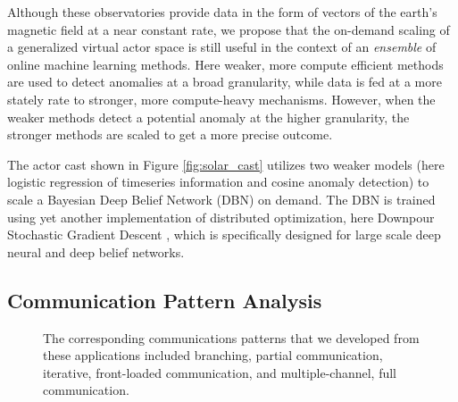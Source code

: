 \documentclass[conference,twocolumn,11pt]{IEEEtran}
\begin{document}
Although these observatories provide data in the form of vectors of the earth's magnetic field at a near constant rate, we propose that the on-demand scaling of a generalized virtual actor space is still useful in the context of an \textit{ensemble} of online machine learning methods. Here weaker, more compute efficient methods are used to detect anomalies at a broad granularity, while data is fed at a more stately rate to stronger, more compute-heavy mechanisms. However, when the weaker methods detect a potential anomaly at the higher granularity, the stronger methods are scaled to get a more precise outcome.

The actor cast shown in Figure \ref{fig:solar_cast} utilizes two weaker models (here logistic regression of timeseries information and cosine anomaly detection) to scale a Bayesian Deep Belief Network (DBN) on demand. The DBN is trained using yet another implementation of distributed optimization, here Downpour Stochastic Gradient Descent \cite{dean_large_2012}, which is specifically designed for large scale deep neural and deep belief networks.

\subsection{Communication Pattern Analysis}

\begin{figure}[!t]
    \centering
    \hfil
    \hfil
    \caption{The corresponding communications patterns that we developed from these applications included branching, partial communication, iterative, front-loaded communication, and multiple-channel, full communication.}
    \label{fig:communications_patterns}
\end{figure}
\end{document}
